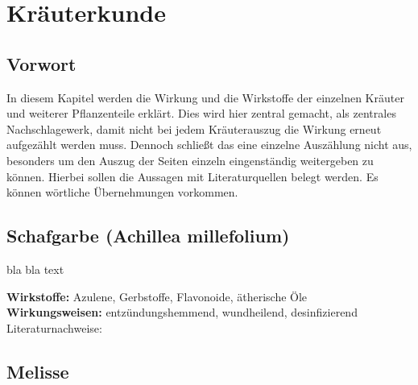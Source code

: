 
\chapter{Kräuterkunde}
\label{   }


\section{Vorwort}
\label{   }


In diesem Kapitel werden die Wirkung und die Wirkstoffe der einzelnen Kräuter und weiterer Pflanzenteile erklärt. Dies wird hier zentral gemacht, als zentrales Nachschlagewerk, damit nicht bei jedem Kräuterauszug die Wirkung erneut aufgezählt werden muss. Dennoch schließt das eine einzelne Auszählung nicht aus, besonders um den Auszug der Seiten einzeln eingenständig weitergeben zu können. Hierbei sollen die Aussagen mit Literaturquellen belegt werden. Es können wörtliche Übernehmungen vorkommen.




\section{Schafgarbe (Achillea millefolium)}
\label{   }



bla bla text

\textbf{Wirkstoffe:} Azulene, Gerbstoffe, Flavonoide, ätherische Öle\\

\textbf{Wirkungsweisen:} entzündungshemmend, wundheilend, desinfizierend\\

Literaturnachweise: \cite{nedoma2018heilsalben}



\section{Melisse}
\label{   }



